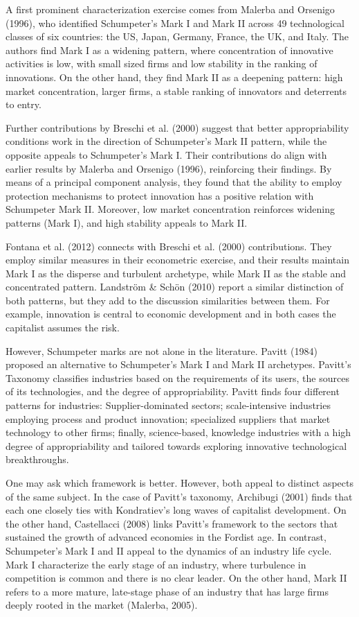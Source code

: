 \documentclass[12pt,a4paper]{article}
\begin{document}
A first prominent characterization exercise comes from Malerba and Orsenigo (1996), who identified Schumpeter’s Mark I and Mark II across 49 technological classes of six countries: the US, Japan, Germany, France, the UK, and Italy. The authors find Mark I as a widening pattern, where concentration of innovative activities is low, with small sized firms and low stability in the ranking of innovations. On the other hand, they find Mark II as a deepening pattern: high market concentration, larger firms, a stable ranking of innovators and deterrents to entry.

Further contributions by Breschi et al. (2000) suggest that better appropriability conditions work in the direction of Schumpeter’s Mark II pattern, while the opposite appeals to Schumpeter’s Mark I. Their contributions do align with earlier results by Malerba and Orsenigo (1996), reinforcing their findings. By means of a principal component analysis, they found that the ability to employ protection mechanisms to protect innovation has a positive relation with Schumpeter Mark II. Moreover, low market concentration reinforces widening patterns (Mark I), and high stability appeals to Mark II.   

Fontana et al. (2012) connects with Breschi et al. (2000) contributions. They employ similar measures in their econometric exercise, and their results maintain Mark I as the disperse and turbulent archetype, while Mark II as the stable and concentrated pattern. Landström \& Schön (2010) report a similar distinction of both patterns, but they add to the discussion similarities between them. For example, innovation is central to economic development and in both cases the capitalist assumes the risk.  

However, Schumpeter marks are not alone in the literature. Pavitt (1984) proposed an alternative to Schumpeter’s Mark I and Mark II archetypes. Pavitt's Taxonomy classifies industries based on the requirements of its users, the sources of its technologies, and the degree of appropriability. Pavitt finds four different patterns for industries: Supplier-dominated sectors; scale-intensive industries employing process and product innovation; specialized suppliers that market technology to other firms; finally, science-based, knowledge industries with a high degree of appropriability and tailored towards exploring innovative technological breakthroughs.  

One may ask which framework is better. However, both appeal to distinct aspects of the same subject. In the case of Pavitt’s taxonomy, Archibugi (2001) finds that each one closely ties with Kondratiev's long waves of capitalist development. On the other hand, Castellacci (2008) links Pavitt’s framework to the sectors that sustained the growth of advanced economies in the Fordist age. In contrast, Schumpeter's Mark I and II appeal to the dynamics of an industry life cycle. Mark I characterize the early stage of an industry, where turbulence in competition is common and there is no clear leader. On the other hand, Mark II refers to a more mature, late-stage phase of an industry that has large firms deeply rooted in the market (Malerba, 2005). 
\end{document}
